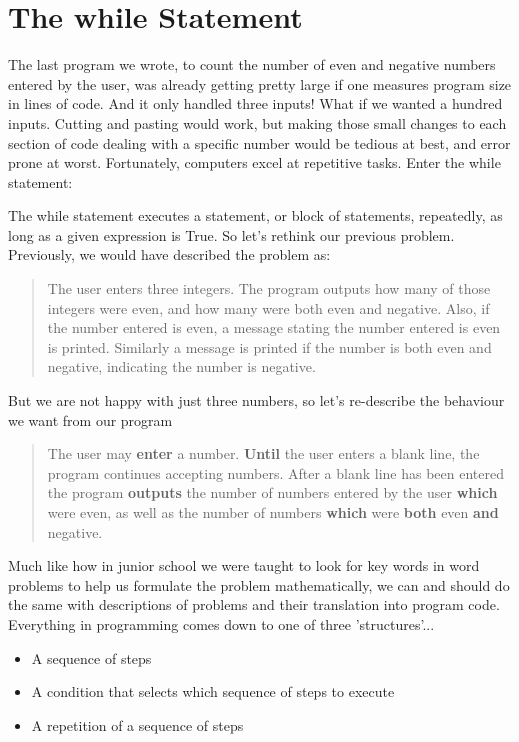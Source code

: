 \section{The while Statement}

The last program we wrote, to count the number of even and negative   numbers entered by the user, was already getting pretty large if one   measures program size in lines of code. And it only handled three   inputs! What if we wanted a hundred inputs.  Cutting and pasting would   work, but making those small changes to each section of code dealing   with a specific number would be tedious at best, and error prone at   worst. Fortunately, computers excel at repetitive tasks.     Enter the while statement:

The while statement executes a statement, or block of statements,   repeatedly, as long as a given expression is True. So let's rethink our   previous problem. Previously, we would have described the problem as:
\begin{quotation}     The user enters three integers. The program outputs how many of    those integers were even, and how many were both even and negative.    Also, if the number entered is even, a message stating the number    entered is even is printed. Similarly a message is printed if the    number is both even and negative, indicating the number is    negative.    
\end{quotation}

But we are not happy with just three numbers, so let's re-describe   the behaviour we want from our program
\begin{quotation}     The user may \textbf{enter} a number.    \textbf{Until} the user enters a blank line, the program    continues accepting numbers. After a blank line has been entered    the program \textbf{outputs} the number of numbers entered    by the user \textbf{which} were even, as well as the number    of numbers \textbf{which} were \textbf{both} even \textbf{and}    negative.    
\end{quotation}

Much like how in junior school we were taught to look for key words   in word problems to help us formulate the problem mathematically, we   can and should do the same with descriptions of problems and their   translation into program code. Everything in programming comes down to   one of three 'structures'...
\begin{itemize}
	\item A sequence of steps
	\item A condition that selects which sequence of steps to    execute
	\item A repetition of a sequence of steps
\end{itemize}


